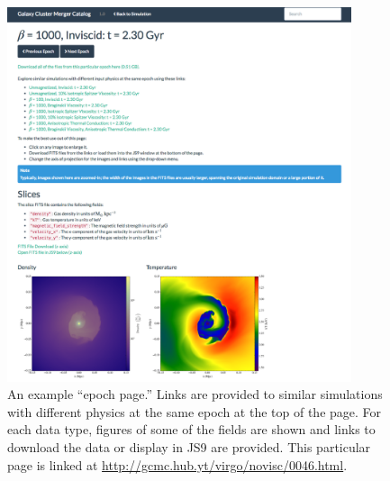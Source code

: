 \documentclass{emulateapj}
\begin{document}
\begin{figure}
\begin{center}
\includegraphics[width=0.9\textwidth]{epoch_page.eps}
\caption{An example ``epoch page.'' Links are provided to similar simulations with different physics at the same epoch at the top of the page. For each data type, figures of some of the fields are shown and links to download the data or display in JS9 are provided. This particular page is linked at \url{http://gcmc.hub.yt/virgo/novisc/0046.html}.\label{fig:epoch_page}}
\end{center}
\end{figure}
\end{document}
